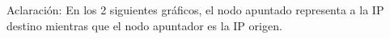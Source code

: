 Aclaración: En los 2 siguientes gráficos, el nodo apuntado representa a la IP destino mientras que el nodo apuntador es la IP origen.

% 
% 



